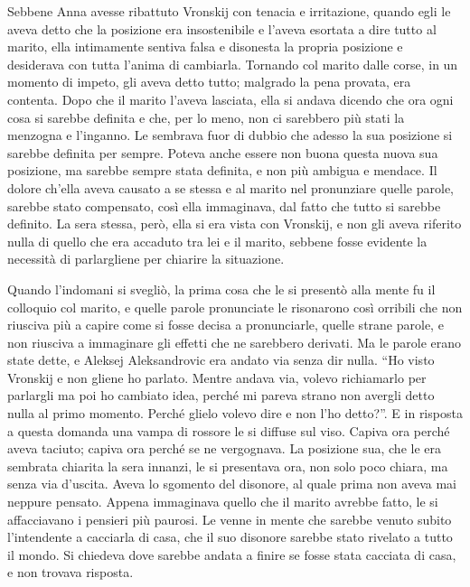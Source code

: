 \label{xv-2} 

Sebbene Anna avesse ribattuto Vronskij con tenacia e irritazione, quando egli le aveva detto che la posizione era insostenibile e l'aveva esortata a dire tutto al marito, ella intimamente sentiva falsa e disonesta la propria posizione e desiderava con tutta l'anima di cambiarla. Tornando col marito dalle corse, in un momento di impeto, gli aveva detto tutto; malgrado la pena provata, era contenta. Dopo che il marito l'aveva lasciata, ella si andava dicendo che ora ogni cosa si sarebbe definita e che, per lo meno, non ci sarebbero più stati la menzogna e l'inganno. Le sembrava fuor di dubbio che adesso la sua posizione si sarebbe definita per sempre. Poteva anche essere non buona questa nuova sua posizione, ma sarebbe sempre stata definita, e non più ambigua e mendace. Il dolore ch'ella aveva causato a se stessa e al marito nel pronunziare quelle parole, sarebbe stato compensato, così ella immaginava, dal fatto che tutto si sarebbe definito. La sera stessa, però, ella si era vista con Vronskij, e non gli aveva riferito nulla di quello che era accaduto tra lei e il marito, sebbene fosse evidente la necessità di parlargliene per chiarire la situazione. 

Quando l'indomani si svegliò, la prima cosa che le si presentò alla mente fu il colloquio col marito, e quelle parole pronunciate le risonarono così orribili che non riusciva più a capire come si fosse decisa a pronunciarle, quelle strane parole, e non riusciva a immaginare gli effetti che ne sarebbero derivati. Ma le parole erano state dette, e Aleksej Aleksandrovic era andato via senza dir nulla. ``Ho visto Vronskij e non gliene ho parlato. Mentre andava via, volevo richiamarlo per parlargli ma poi ho cambiato idea, perché mi pareva strano non avergli detto nulla al primo momento. Perché glielo volevo dire e non l'ho detto?''. E in risposta a questa domanda una vampa di rossore le si diffuse sul viso. Capiva ora perché aveva taciuto; capiva ora perché se ne vergognava. La posizione sua, che le era sembrata chiarita la sera innanzi, le si presentava ora, non solo poco chiara, ma senza via d'uscita. Aveva lo sgomento del disonore, al quale prima non aveva mai neppure pensato. Appena immaginava quello che il marito avrebbe fatto, le si affacciavano i pensieri più paurosi. Le venne in mente che sarebbe venuto subito l'intendente a cacciarla di casa, che il suo disonore sarebbe stato rivelato a tutto il mondo. Si chiedeva dove sarebbe andata a finire se fosse stata cacciata di casa, e non trovava risposta. 

